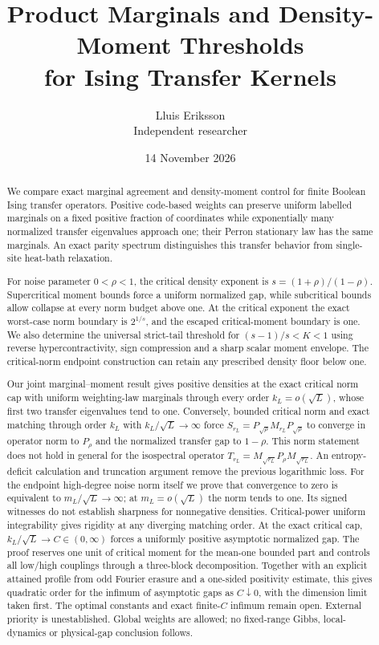 \documentclass[11pt]{article}
\title{Product Marginals and Density-Moment Thresholds\\for Ising Transfer Kernels}
\author{Lluis Eriksson\\\small Independent researcher}
\date{14 November 2026}
\begin{document}
\maketitle

\begin{abstract}
We compare exact marginal agreement and density-moment control for finite
Boolean Ising transfer operators. Positive code-based weights can preserve
uniform labelled marginals on a fixed positive fraction of coordinates while
exponentially many normalized transfer eigenvalues approach one; their Perron
stationary law has the same marginals. An exact parity spectrum distinguishes
this transfer behavior from single-site heat-bath relaxation.

For noise parameter $0<\rho<1$, the critical density exponent is
$s=(1+\rho)/(1-\rho)$. Supercritical moment bounds force a uniform
normalized gap, while subcritical bounds allow collapse at every norm budget
above one. At the critical exponent the exact worst-case norm boundary is
$2^{1/s}$, and the escaped critical-moment boundary is one. We also determine
the universal strict-tail threshold for $(s-1)/s<K<1$ using reverse
hypercontractivity, sign compression and a sharp scalar moment envelope.
The critical-norm endpoint construction can retain any prescribed density floor below one.

Our joint marginal--moment result gives positive densities at the exact
critical norm cap with uniform weighting-law marginals through every
order $k_L=o(\sqrt L)$, whose first
two transfer eigenvalues tend to one. Conversely, bounded critical norm
and exact matching through order $k_L$ with $k_L/\sqrt L\to\infty$
force $S_{r_L}=P_{\sqrt\rho}M_{r_L}P_{\sqrt\rho}$ to converge in
operator norm to $P_\rho$ and the normalized transfer gap to $1-\rho$.
This norm statement does not hold in general for the isospectral operator
$T_{r_L}=M_{\sqrt{r_L}}P_\rho M_{\sqrt{r_L}}$. An entropy-deficit
calculation and truncation argument remove the previous logarithmic loss.
For the endpoint high-degree noise norm itself we prove that convergence
to zero is equivalent to $m_L/\sqrt L\to\infty$; at $m_L=o(\sqrt L)$
the norm tends to one. Its signed witnesses do not establish sharpness
for nonnegative densities. Critical-power uniform integrability gives
rigidity at any diverging matching order. At the exact critical cap,
$k_L/\sqrt L\to C\in(0,\infty)$ forces a uniformly positive
asymptotic normalized gap. The proof reserves one unit of critical moment
for the mean-one bounded part and controls all low/high couplings through
a three-block decomposition. Together with an explicit attained profile
from odd Fourier erasure and a one-sided positivity estimate, this gives
quadratic order for the infimum of asymptotic gaps as $C\downarrow0$,
with the dimension limit taken first. The optimal constants and exact
finite-$C$ infimum remain open. External priority is unestablished.
Global weights are allowed;
no fixed-range Gibbs, local-dynamics or physical-gap conclusion follows.
\end{abstract}
\end{document}

